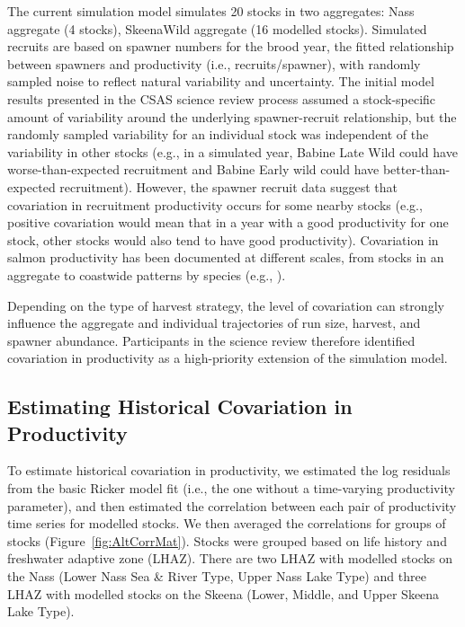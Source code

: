 \documentclass[french,11pt]{book}
\begin{document}
The current simulation model simulates 20 stocks in two aggregates: Nass aggregate (4 stocks), SkeenaWild aggregate (16 modelled stocks). Simulated recruits are based on spawner numbers for the brood year, the fitted relationship between spawners and productivity (i.e., recruits/spawner), with randomly sampled noise to reflect natural variability and uncertainty. The initial model results presented in the CSAS science review process assumed a stock-specific amount of variability around the underlying spawner-recruit relationship, but the randomly sampled variability for an individual stock was independent of the variability in other stocks (e.g., in a simulated year, Babine Late Wild could have worse-than-expected recruitment and Babine Early wild could have better-than-expected recruitment). However, the spawner recruit data suggest that covariation in recruitment productivity occurs for some nearby stocks (e.g., positive covariation would mean that in a year with a good productivity for one stock, other stocks would also tend to have good productivity). Covariation in salmon productivity has been documented at different scales, from stocks in an aggregate to coastwide patterns by species (e.g., ).

Depending on the type of harvest strategy, the level of covariation can strongly influence the aggregate and individual trajectories of run size, harvest, and spawner abundance. Participants in the science review therefore identified covariation in productivity as a high-priority extension of the simulation model.

\subsection{Estimating Historical Covariation in Productivity}\label{estimating-historical-covariation-in-productivity}

To estimate historical covariation in productivity, we estimated the log residuals from the basic Ricker model fit (i.e., the one without a time-varying productivity parameter), and then estimated the correlation between each pair of productivity time series for modelled stocks. We then averaged the correlations for groups of stocks (Figure~\ref{fig:AltCorrMat}). Stocks were grouped based on life history and freshwater adaptive zone (LHAZ). There are two LHAZ with modelled stocks on the Nass (Lower Nass Sea \& River Type, Upper Nass Lake Type) and three LHAZ with modelled stocks on the Skeena (Lower, Middle, and Upper Skeena Lake Type).
\end{document}
